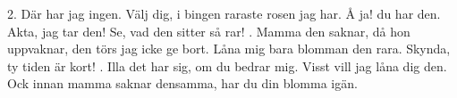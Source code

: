 \setlength{\columnsep}{0.3cm}
\begin{multicols}{3}
2.  Där har jag ingen.
    Välj dig, i bingen
    raraste rosen jag har.
    Å ja! du har den.
    Akta, jag tar den!
    Se, vad den sitter så rar!
\vfill{}.  Mamma den saknar,
    då hon uppvaknar,
    den törs jag icke ge bort.
    Låna mig bara
    blomman den rara.
    Skynda, ty tiden är kort!
\vfill{}.  Illa det har sig,
    om du bedrar mig.
    Visst vill jag låna dig den.
    Ock innan mamma
    saknar densamma,
    har du din blomma igän.
\end{multicols}
